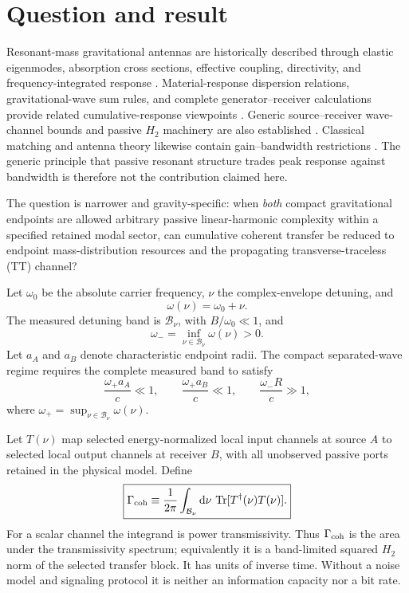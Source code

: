 \section{Question and result}
\label{sec:question}

Resonant-mass gravitational antennas are historically described through elastic eigenmodes, absorption cross sections, effective coupling, directivity, and frequency-integrated response \cite{Hirakawa1976,PaikWagoner1976,Lobo1995,Aguiar2011}. Material-response dispersion relations, gravitational-wave sum rules, and complete generator--receiver calculations provide related cumulative-response viewpoints \cite{Srivastava2003,Rudenko2003}. Generic source--receiver wave-channel bounds and passive $H_2$ machinery are also established \cite{Miller2000,Molesky2020,BarasBrockett1975,Opmeer2013}. Classical matching and antenna theory likewise contain gain--bandwidth restrictions \cite{Fano1950,Chu1948,Harrington1960}. The generic principle that passive resonant structure trades peak response against bandwidth is therefore not the contribution claimed here.

The question is narrower and gravity-specific: when \emph{both} compact gravitational endpoints are allowed arbitrary passive linear-harmonic complexity within a specified retained modal sector, can cumulative coherent transfer be reduced to endpoint mass-distribution resources and the propagating transverse-traceless (TT) channel?

Let $\omega_0$ be the absolute carrier frequency, $\nu$ the complex-envelope detuning, and
\begin{equation}
\omega(\nu)=\omega_0+\nu .
\end{equation}
The measured detuning band is $\mathcal B_\nu$, with $B/\omega_0\ll1$, and
\begin{equation}
\omega_-=\inf_{\nu\in\mathcal B_\nu}\omega(\nu)>0 .
\label{eq:omegamin}
\end{equation}
Let $a_A$ and $a_B$ denote characteristic endpoint radii. The compact separated-wave regime requires the complete measured band to satisfy
\begin{equation}
\frac{\omega_+a_A}{c}\ll1,\qquad
\frac{\omega_+a_B}{c}\ll1,\qquad
\frac{\omega_-R}{c}\gg1 ,
\label{eq:geometryscope}
\end{equation}
where $\omega_+=\sup_{\nu\in\mathcal B_\nu}\omega(\nu)$.

Let $T(\nu)$ map selected energy-normalized local input channels at source $A$ to selected local output channels at receiver $B$, with all unobserved passive ports retained in the physical model. Define
\begin{equation}
\boxed{
\Gamma_{\rm coh}
\equiv
\frac{1}{2\pi}
\int_{\mathcal B_\nu}\mathrm d\nu\,
\operatorname{Tr}[T^\dagger(\nu)T(\nu)] .
}
\label{eq:gamma}
\end{equation}
For a scalar channel the integrand is power transmissivity. Thus $\Gamma_{\rm coh}$ is the area under the transmissivity spectrum; equivalently it is a band-limited squared $H_2$ norm of the selected transfer block. It has units of inverse time. Without a noise model and signaling protocol it is neither an information capacity nor a bit rate.

